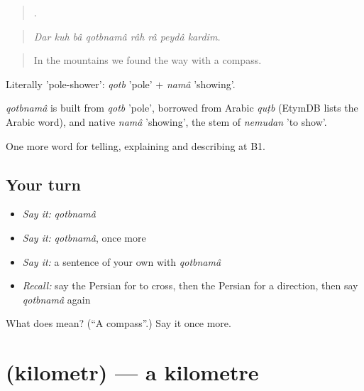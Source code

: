 \begin{quote}
        .
\end{quote}

\begin{quote}
\emph{Dar kuh bâ qotbnamâ râh râ peydâ kardim.}
\end{quote}

\begin{quote}
In the mountains we found the way with a compass.
\end{quote}

Literally 'pole-shower': \emph{qotb} 'pole' + \emph{namâ} 'showing'.

\begin{cousinweb}
\emph{qotbnamâ} is built from \emph{qotb} 'pole', borrowed from Arabic \emph{quṭb} (EtymDB lists the Arabic word), and native \emph{namâ} 'showing', the stem of \emph{nemudan} 'to show'.
\end{cousinweb}

\begin{grammarlens}[title={What you've built}]
One more word for telling, explaining and describing at B1.
\end{grammarlens}

\subsection*{Your turn}
\begin{itemize}
\raggedright
  \item \emph{Say it:} \emph{qotbnamâ}
  \item \emph{Say it:} \emph{qotbnamâ}, once more
  \item \emph{Say it:} a sentence of your own with \emph{qotbnamâ}
  \item \emph{Recall:} say the Persian for to cross, then the Persian for a direction, then say \emph{qotbnamâ} again
\end{itemize}

\begin{tcolorbox}[breakable,colback=teal!4,colframe=teal!35!black,title={Before you move on}]
What does   mean? (\textquotedblleft{}A compass\textquotedblright{}.) Say it once more.
\end{tcolorbox}
\section[\texorpdfstring{\fa{کیلومتر} (kilometr)}{کیلومتر (kilometr)}]{ (kilometr) — a kilometre}


